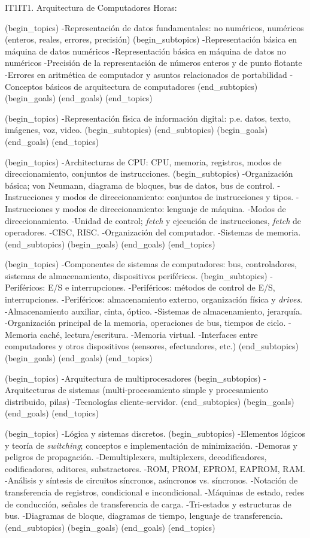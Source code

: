 \begin{BKL2}{IT1}{IT1. Arquitectura de Computadores}
Horas:

(begin_topics)
-Representación de datos fundamentales: no numéricos, numéricos (enteros, reales, errores, precisión)
(begin_subtopics)
-Representación básica en máquina de datos numéricos
-Representación básica en máquina de datos no numéricos
-Precisión de la representación de números enteros y de punto flotante
-Errores en aritmética de computador y asuntos relacionados de portabilidad
-Conceptos básicos de arquitectura de computadores
(end_subtopics)
(begin_goals)
(end_goals)
(end_topics)

(begin_topics)
-Representación física de información digital: p.e. datos, texto, imágenes, voz, video.
(begin_subtopics)
(end_subtopics)
(begin_goals)
(end_goals)
(end_topics)

(begin_topics)
-Architecturas de CPU: CPU, memoria, registros, modos de direccionamiento, conjuntos de instrucciones.
(begin_subtopics)
-Organización básica; von Neumann, diagrama de bloques, bus de datos, bus de control.
-Instrucciones y modos de direccionamiento: conjuntos de instrucciones y tipos.
-Instrucciones y modos de direccionamiento: lenguaje de máquina.
-Modos de direccionamiento.
-Unidad de control; {\it fetch} y ejecución de instrucciones, {\it fetch} de operadores.
-CISC, RISC.
-Organización del computador.
-Sistemas de memoria.
(end_subtopics)
(begin_goals)
(end_goals)
(end_topics)

(begin_topics)
-Componentes de sistemas de computadores: bus, controladores, sistemas de almacenamiento, dispositivos periféricos.
(begin_subtopics)
-Periféricos: E/S e interrupciones.
-Periféricos: métodos de control de E/S, interrupciones.
-Periféricos: almacenamiento externo, organización física y {\it drives}.
-Almacenamiento auxiliar, cinta, óptico.
-Sistemas de almacenamiento, jerarquía.
-Organización principal de la memoria, operaciones de bus, tiempos de ciclo.
-Memoria caché, lectura/escritura.
-Memoria virtual.
-Interfaces entre computadores y otros dispositivos (sensores, efectuadores, etc.)
(end_subtopics)
(begin_goals)
(end_goals)
(end_topics)

(begin_topics)
-Arquitectura de multiprocesadores
(begin_subtopics)
-Arquitecturas de sistemas (multi-procesamiento simple y procesamiento distribuido, pilas)
-Tecnologías cliente-servidor.
(end_subtopics)
(begin_goals)
(end_goals)
(end_topics)

(begin_topics)
-Lógica y sistemas discretos.
(begin_subtopics)
-Elementos lógicos y teoría de {\it switching}; conceptos e implementación de minimización.
-Demoras y peligros de propagación.
-Demultiplexers, multiplexers, decodificadores, codificadores, aditores, substractores.
-ROM, PROM, EPROM, EAPROM, RAM.
-Análisis y síntesis de circuitos síncronos, asíncronos vs. síncronos.
-Notación de transferencia de registros, condicional e incondicional.
-Máquinas de estado, redes de conducción, señales de transferencia de carga.
-Tri-estados y estructuras de bus.
-Diagramas de bloque, diagramas de tiempo, lenguaje de transferencia.
(end_subtopics)
(begin_goals)
(end_goals)
(end_topics)
\end{BKL2}

